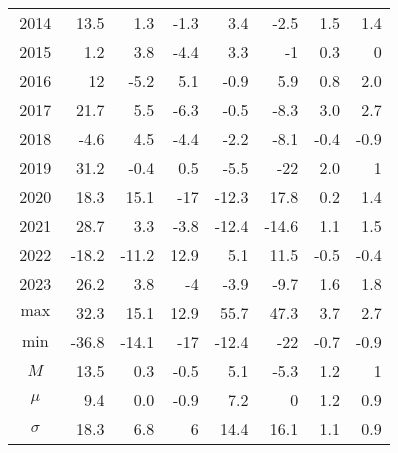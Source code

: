 \documentclass{article}
\begin{document}
\begin{table}[!ht]
\begin{tabular}{ c | r || rr || rr || rr}
        2014 & 13.5 & \cellcolor{green!25}1.3 & -1.3 & \cellcolor{green!25}3.4 & -2.5 & \cellcolor{green!25}1.5 & 1.4 \\ 
        2015 & 1.2 & \cellcolor{green!25}3.8 & -4.4 & \cellcolor{green!25}3.3 & -1 & \cellcolor{green!25}0.3 & 0 \\ 
        2016 & 12 & -5.2 & \cellcolor{green!25}5.1 & -0.9 & \cellcolor{green!25}5.9 & 0.8 & \cellcolor{green!25}2.0 \\ 
        2017 & 21.7 & \cellcolor{green!25}5.5 & -6.3 & \cellcolor{green!25}-0.5 & -8.3 & \cellcolor{green!25}3.0 & 2.7 \\ 
        2018 & -4.6 & \cellcolor{green!25}4.5 & -4.4 & \cellcolor{green!25}-2.2 & -8.1 & \cellcolor{green!25}-0.4 & -0.9 \\ 
        2019 & 31.2 & -0.4 & \cellcolor{green!25}0.5 & \cellcolor{green!25}-5.5 & -22 & \cellcolor{green!25}2.0 & 1 \\ 
        2020 & 18.3 & \cellcolor{green!25}15.1 & -17 & -12.3 & \cellcolor{green!25}17.8 & 0.2 & \cellcolor{green!25}1.4 \\ 
        2021 & 28.7 & \cellcolor{green!25}3.3 & -3.8 & \cellcolor{green!25}-12.4 & -14.6 & 1.1 & \cellcolor{green!25}1.5 \\ 
        2022 & -18.2 & -11.2 & \cellcolor{green!25}12.9 & 5.1 & \cellcolor{green!25}11.5 & -0.5 & \cellcolor{green!25}-0.4 \\ 
        2023 & 26.2 & \cellcolor{green!25}3.8 & -4 & \cellcolor{green!25}-3.9 & -9.7 & 1.6 & \cellcolor{green!25}1.8 \\ \hline
        $\max$ & 32.3 & \cellcolor{green!25}15.1 & 12.9 & \cellcolor{green!25}55.7 & 47.3 & \cellcolor{green!25}3.7 & 2.7 \\ 
        $\min$ & -36.8 & \cellcolor{green!25}-14.1 & -17 & \cellcolor{green!25}-12.4 & -22 & \cellcolor{green!25}-0.7 & -0.9 \\ 
        $M$ & 13.5 & \cellcolor{green!25}0.3 & -0.5 & \cellcolor{green!25}5.1 & -5.3 & \cellcolor{green!25}1.2 & 1 \\ 
        $\mu$ & 9.4 & \cellcolor{green!25}0.0 & -0.9 & \cellcolor{green!25}7.2 & 0 & \cellcolor{green!25}1.2 & 0.9 \\ 
        $\sigma$ & 18.3 & \cellcolor{green!25}6.8 & 6 & 14.4 & \cellcolor{green!25}16.1 & \cellcolor{green!25}1.1 & 0.9 \\ 
\hline
\end{tabular}
\label{tab:comparison_tracking_errors_sharp_ratios}
\end{table}
\end{document}
